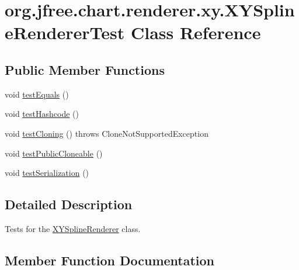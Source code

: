 \hypertarget{classorg_1_1jfree_1_1chart_1_1renderer_1_1xy_1_1_x_y_spline_renderer_test}{}\section{org.\+jfree.\+chart.\+renderer.\+xy.\+X\+Y\+Spline\+Renderer\+Test Class Reference}
\label{classorg_1_1jfree_1_1chart_1_1renderer_1_1xy_1_1_x_y_spline_renderer_test}
\subsection*{Public Member Functions}
\begin{DoxyCompactItemize}
\item 
void \mbox{\hyperlink{classorg_1_1jfree_1_1chart_1_1renderer_1_1xy_1_1_x_y_spline_renderer_test_afa932e27cdc029e39ff812fcb6ff6af2}{test\+Equals}} ()
\item 
void \mbox{\hyperlink{classorg_1_1jfree_1_1chart_1_1renderer_1_1xy_1_1_x_y_spline_renderer_test_ac1f2cd3d684b3feeb5ef344ad93e6ad5}{test\+Hashcode}} ()
\item 
void \mbox{\hyperlink{classorg_1_1jfree_1_1chart_1_1renderer_1_1xy_1_1_x_y_spline_renderer_test_af0d4f3fa315477d0df0181a6529a6499}{test\+Cloning}} ()  throws Clone\+Not\+Supported\+Exception 
\item 
void \mbox{\hyperlink{classorg_1_1jfree_1_1chart_1_1renderer_1_1xy_1_1_x_y_spline_renderer_test_a9d37e01b8f4b924a19d8b18a940e42b0}{test\+Public\+Cloneable}} ()
\item 
void \mbox{\hyperlink{classorg_1_1jfree_1_1chart_1_1renderer_1_1xy_1_1_x_y_spline_renderer_test_a3bba864a9ce63ec679d8b3ed3c7a68cc}{test\+Serialization}} ()
\end{DoxyCompactItemize}


\subsection{Detailed Description}
Tests for the \mbox{\hyperlink{classorg_1_1jfree_1_1chart_1_1renderer_1_1xy_1_1_x_y_spline_renderer}{X\+Y\+Spline\+Renderer}} class. 

\subsection{Member Function Documentation}
\mbox{\label{classorg_1_1jfree_1_1chart_1_1renderer_1_1xy_1_1_x_y_spline_renderer_test_af0d4f3fa315477d0df0181a6529a6499}} 
